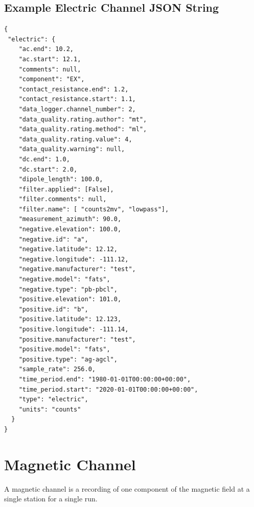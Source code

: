 \documentclass{article}
\begin{document}
\clearpage
\newpage
\subsection{Example Electric Channel JSON String}

\begin{verbatim}
{
 "electric": {
    "ac.end": 10.2,
    "ac.start": 12.1,
    "comments": null,
    "component": "EX",
    "contact_resistance.end": 1.2,
    "contact_resistance.start": 1.1,
    "data_logger.channel_number": 2,
    "data_quality.rating.author": "mt",
    "data_quality.rating.method": "ml",
    "data_quality.rating.value": 4,
    "data_quality.warning": null,
    "dc.end": 1.0,
    "dc.start": 2.0,
    "dipole_length": 100.0,
    "filter.applied": [False],
    "filter.comments": null,
    "filter.name": [ "counts2mv", "lowpass"],
    "measurement_azimuth": 90.0,
    "negative.elevation": 100.0,
    "negative.id": "a",
    "negative.latitude": 12.12,
    "negative.longitude": -111.12,
    "negative.manufacturer": "test",
    "negative.model": "fats",
    "negative.type": "pb-pbcl",
    "positive.elevation": 101.0,
    "positive.id": "b",
    "positive.latitude": 12.123,
    "positive.longitude": -111.14,
    "positive.manufacturer": "test",
    "positive.model": "fats",
    "positive.type": "ag-agcl",
    "sample_rate": 256.0,
    "time_period.end": "1980-01-01T00:00:00+00:00",
    "time_period.start": "2020-01-01T00:00:00+00:00",
    "type": "electric",
    "units": "counts"
  }
}
\end{verbatim}

\clearpage
\newpage
\section{Magnetic Channel}

A magnetic channel is a recording of one component of the magnetic field at a single station for a single run.
\end{document}
